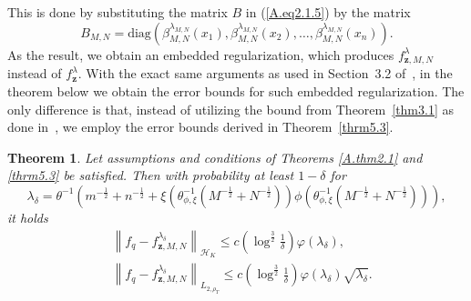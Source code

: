 \documentclass[USenglish]{article}
\newcommand{\norm}[1]{\left\lVert#1\right\rVert}
\newcommand{\bz}{\mathbf{z}}
\newtheorem{theorem}{Theorem}[section]
\begin{document}
This is done by substituting the matrix $B$ in (\ref{A.eq2.1.5}) by the matrix $$B_{M,N} = \mathrm{diag}(\beta_{M,N}^{\lambda_{M,N}} (x_1),\beta_{M,N}^{\lambda_{M,N}} (x_2),\ldots,\beta_{M,N}^{\lambda_{M,N}} (x_n) ).$$
As the result, we obtain an embedded regularization, which produces $f_{\bz,M,N}^{\lambda}$ instead of $f_\bz^\lambda$.
With the exact same arguments as used in Section~3.2 of~\cite{gizewski2022regularization}, in the theorem below we obtain the error bounds for such embedded regularization.
The only difference is that, instead of utilizing the bound from Theorem~\ref{thm3.1} as done in~\cite[Section~3.2]{gizewski2022regularization}, we employ the error bounds derived in Theorem~\ref{thrm5.3}. 
\begin{theorem}\label{new_thm4.1}
		Let assumptions and conditions of Theorems \ref{A.thm2.1} and \ref{thrm5.3} be satisfied. Then with probability at least $1 - \delta$ for 
		$$\lambda_\delta = \theta^{-1} \left( m^{-\frac{1}{2}} + n^{-\frac{1}{2}} + \xi (\theta_{\phi,\xi}^{-1} (M^{-\frac{1}{2}}  + N^{-\frac{1}{2}}) ) \phi (\theta_{\phi,\xi}^{-1} (M^{-\frac{1}{2}}  + N^{-\frac{1}{2}} ) ) \right),$$
		it holds
    \begin{align*}
		&\norm{f_q - f_{\bz,M,N}^{\lambda_\delta}    }_{\mathcal{H}_K} \leq c \left( \log^{\frac{3}{2} } \frac{1}{\delta} \right) \varphi \left(\lambda_\delta \right),\\
		&\norm{ f_q - f_{\bz,M,N}^{\lambda_\delta} }_{L_{2,\rho_T}} \leq c \left( \log^{\frac{3}{2} } \frac{1}{\delta} \right) \varphi \left(\lambda_\delta  \right) \sqrt{\lambda_\delta}.
		\end{align*} 
	\end{theorem}
\end{document}
